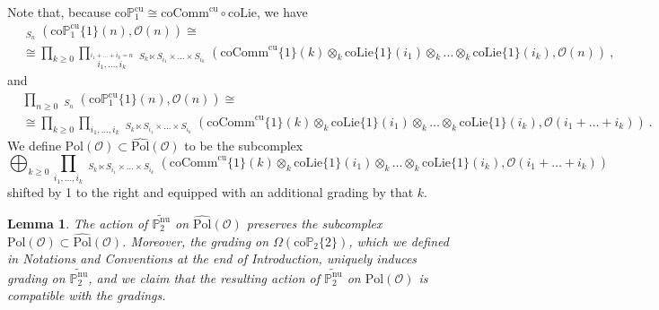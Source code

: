 \documentclass[10pt, oneside]{amsart}
\theoremstyle{plain}
\newtheorem{lemma}[equation]{Lemma}
\newcommand{\ccomm}{\mathrm{coComm}}
\newcommand{\colie}{\mathrm{coLie}}
\renewcommand{\O}{\mathcal{O}}
\newcommand{\omp}{{\Omega(\mathrm{co}\mathbb{P}_2\{2\})}}
\newcommand{\PP}{\mathbb{P}}
\newcommand{\pol}{\mathrm{Pol}}
\newcommand{\cpol}{\widehat{\mathrm{Pol}}}
\DeclareMathOperator{\uhom}{\underline{Hom}}
\newcommand{\cucoP}{\mathrm{co}\PP^{\text{cu}}}
\newcommand{\tP}{{\widetilde{\mathbb{P}^\mathrm{nu}_2}}}
\begin{document}
\begin{definition}
Note that, because $\cucoP_1 \cong \ccomm^\text{cu} \circ \colie$, we have
\begin{equation*}
\begin{split}
& \uhom_{S_n} (\cucoP_1\{1\}(n), \O(n)) \cong \\
&\cong \prod_{k \ge 0} \prod_{\stackrel{i_1 + \ldots + i_k = n}{i_1, \ldots, i_k}} \uhom_{S_k \ltimes S_{i_1} \times \ldots \times S_{i_k}} (\ccomm^\text{cu}\{1\}(k) \otimes_k \colie\{1\}(i_1) \otimes_k \ldots \otimes_k \colie\{1\}(i_k), \O(n)) \:,
\end{split}
\end{equation*}
and
\begin{equation*}
\begin{split}
& \prod_{n\ge 0} \uhom_{S_n} (\cucoP_1\{1\}(n), \O(n)) \cong \\
&\cong \prod_{k \ge 0} \prod_{i_1, \ldots, i_k} \uhom_{S_k \ltimes S_{i_1} \times \ldots \times S_{i_k}} (\ccomm^\text{cu}\{1\}(k) \otimes_k \colie\{1\}(i_1) \otimes_k \ldots \otimes_k \colie\{1\}(i_k), \O(i_1 + \ldots + i_k)) \:.
\end{split}
\end{equation*}
We define $\pol(\O) \subset \cpol(\O)$ to be the subcomplex
\begin{equation*}
\bigoplus_{k \ge 0} \prod_{i_1, \ldots, i_k} \uhom_{S_k \ltimes S_{i_1} \times \ldots \times S_{i_k}} (\ccomm^\text{cu}\{1\}(k) \otimes_k \colie\{1\}(i_1) \otimes_k \ldots \otimes_k \colie\{1\}(i_k), \O(i_1 + \ldots + i_k))
\end{equation*}
shifted by 1 to the right and equipped with an additional grading by that $k$.
\end{definition}
\begin{lemma}
The action of $\tP$ on $\cpol(\O)$ preserves the subcomplex $\pol(\O) \subset \cpol(\O)$. Moreover, the grading on $\omp$, which
we defined in Notations and Conventions at the end of Introduction, uniquely induces grading on $\tP$, and we claim that the resulting 
action of $\tP$ on $\pol(\O)$ is compatible with the gradings.
\end{lemma}
\end{document}
